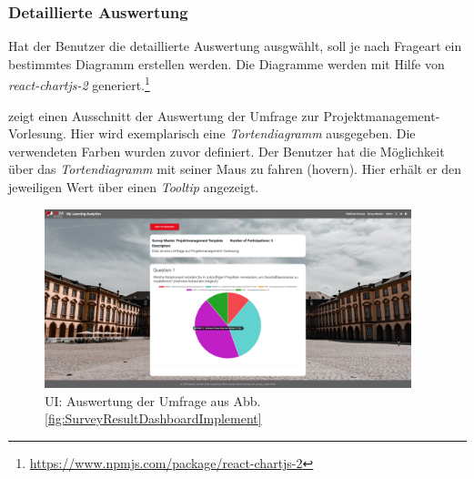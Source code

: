 \subsubsection*{Detaillierte Auswertung}
Hat der Benutzer die detaillierte Auswertung ausgwählt, soll je nach Frageart ein bestimmtes Diagramm erstellen werden. 
Die Diagramme werden mit Hilfe von \emph{react-chartjs-2} generiert.\footnote{\url{https://www.npmjs.com/package/react-chartjs-2}} 

\abb {} zeigt einen Ausschnitt der Auswertung der Umfrage zur Projektmanagement-Vorlesung. 
Hier wird exemplarisch eine \emph{Tortendiagramm} ausgegeben. 
Die verwendeten Farben wurden zuvor definiert. 
Der Benutzer hat die Möglichkeit über das \emph{Tortendiagramm} mit seiner Maus zu fahren (hovern).
Hier erhält er den jeweiligen Wert über einen \emph{Tooltip} angezeigt.

\begin{figure}[!htb]
	\centering
	\includegraphics[width=0.95\textwidth, keepaspectratio]{img/client/SurveyResultDetail2.png}
	\captionsetup{justification=centering, format=plain}
	\caption[\acf{UI}: Auswertung der Umfrage]{\acf{UI}: Auswertung der Umfrage aus Abb. \vref{fig:SurveyResultDashboardImplement} \\ \quelleScreenshot}
	\label{fig:SurveyResultDetailImplement}
\end{figure}
